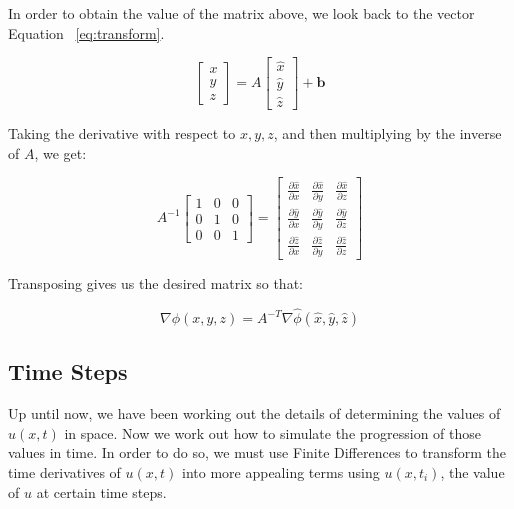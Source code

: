 In order to obtain the value of the matrix above, we look back to the vector Equation ~\ref{eq:transform}.

\begin{equation}
\begin{bmatrix}
x \\
y \\
z
\end{bmatrix}
= A \begin{bmatrix}
\hat{x} \\ 
\hat{y} \\ 
\hat{z}
\end{bmatrix} + \boldsymbol{b}
\end{equation}


Taking the derivative with respect to $x,y,z$, and then multiplying by the inverse of $A$, we get:

\begin{equation}
A^{-1}\begin{bmatrix}
1 & 0 & 0 \\
0 & 1 & 0 \\
0 & 0 & 1
\end{bmatrix}
= \begin{bmatrix}
\frac{\partial \hat{x}}{\partial x} & \frac{\partial \hat{x}}{\partial y} & \frac{\partial \hat{x}}{\partial z} \\ 
\frac{\partial \hat{y}}{\partial x} & \frac{\partial \hat{y}}{\partial y} & \frac{\partial \hat{y}}{\partial z} \\ 
\frac{\partial \hat{z}}{\partial x} & \frac{\partial \hat{z}}{\partial y} & \frac{\partial \hat{z}}{\partial z}
\end{bmatrix}
\end{equation}

Transposing gives us the desired matrix so that:

\begin{equation}
\nabla \phi(x,y,z) = A^{-T} \nabla \hat{\phi}(\hat{x}, \hat{y}, \hat{z})
\end{equation}


 

\subsection{Time Steps}

Up until now, we have been working out the details of determining the values of $u(x,t)$ in space. Now we work out how to simulate the progression of those values in time. In order to do so, we must use Finite Differences to transform the time derivatives of $u(x,t)$ into more appealing terms using $u(x,t_i)$, the value of $u$ at certain time steps. 

